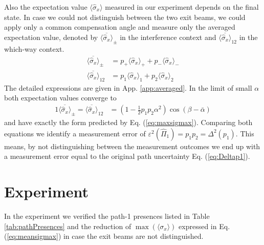 \documentclass[english,keywords,aps,twocolumn]{revtex4-1}
\begin{document}
Also the expectation value $\langle \hat \sigma_{x}\rangle$  measured in our experiment depends on the final state. In case we could not distinguish between the two exit beams, we could apply only a common compensation angle and measure only the averaged expectation value, denoted by $\overline{\langle\hat\sigma_x\rangle}_{\pm}$ in the interference context and $\overline{\langle\hat\sigma_x\rangle}_{12}$ in the which-way context. 
\begin{subequations}
\begin{alignat}{1}
  \overline{\langle\hat\sigma_x\rangle}_{\pm} &=  p_+ \langle\hat\sigma_{x}\rangle_+  + p_-  \langle \hat\sigma_{x}\rangle_-\\
 \overline{\langle\hat\sigma_x\rangle}_{12} &=  p_1 \langle\hat\sigma_{x}\rangle_1  + p_2  \langle \hat\sigma_{x}\rangle_2 %
\end{alignat}
\end{subequations}
The detailed expressions are given in App. \ref{app:averaged}. In the limit of small $\alpha$ both expectation values converge to
\begin{alignat}{1}
 \overline{\langle\hat\sigma_x\rangle}_{\pm} = 
 \overline{\langle\hat\sigma_x\rangle}_{12} &= 
  \left(1 - \frac 1 2 p_1 p_2 \alpha^2\right)  \cos(\beta - \bar\alpha) \label{eq:meansigmax}
\end{alignat}
and have exactly the form predicted by Eq. (\ref{eq:maxsigmax}). 
Comparing both equations  we  identify a measurement error of $\varepsilon^2(\hat \Pi_1)  = p_1 p_2 =\mathit\Delta^2(p_{1})$. This means, by not distinguishing between the measurement outcomes we end up with a measurement error equal to the original path uncertainty Eq. (\ref{eq:Deltap1}).


\section{Experiment}

In the experiment we verified the path-1 presences listed in Table \ref{tab:pathPresences} and the reduction of $\max(\langle\sigma_x\rangle)$ expressed in Eq. (\ref{eq:meansigmax}) in case the exit beams are not distinguished. 
\end{document}
